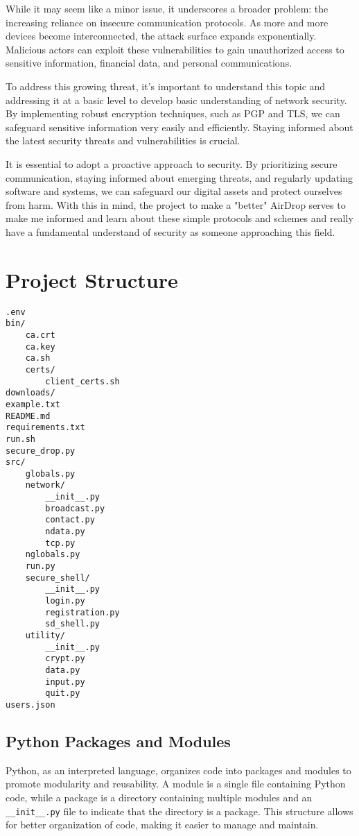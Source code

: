 \documentclass[12pt]{article}
\begin{document}
While it may seem like a minor issue, it underscores a broader problem: the increasing reliance on insecure communication protocols. As more and more devices become interconnected, the attack surface expands exponentially. Malicious actors can exploit these vulnerabilities to gain unauthorized access to sensitive information, financial data, and personal communications.

To address this growing threat, it's important to understand this topic and addressing it at a basic level to develop basic understanding of network security. By implementing robust encryption techniques, such as PGP and TLS, we can safeguard sensitive information very easily and efficiently. Staying informed about the latest security threats and vulnerabilities is crucial.

It is essential to adopt a proactive approach to security. By prioritizing secure communication, staying informed about emerging threats, and regularly updating software and systems, we can safeguard our digital assets and protect ourselves from harm. With this in mind, the project to make a "better" AirDrop serves to make me informed and learn about these simple protocols and schemes and really have a fundamental understand of security as someone approaching this field.

\newpage
\section{Project Structure}
\begin{verbatim}
.env
bin/
    ca.crt
    ca.key
    ca.sh
    certs/
        client_certs.sh
downloads/
example.txt
README.md
requirements.txt
run.sh
secure_drop.py
src/
    globals.py
    network/
        __init__.py
        broadcast.py
        contact.py
        ndata.py
        tcp.py
    nglobals.py
    run.py
    secure_shell/
        __init__.py
        login.py
        registration.py
        sd_shell.py
    utility/
        __init__.py
        crypt.py
        data.py
        input.py
        quit.py
users.json
\end{verbatim}

\subsection{Python Packages and Modules}
Python, as an interpreted language, organizes code into packages and modules to promote modularity and reusability. A module is a single file containing Python code, while a package is a directory containing multiple modules and an \texttt{\_\_init\_\_.py} file to indicate that the directory is a package. This structure allows for better organization of code, making it easier to manage and maintain.
\end{document}
